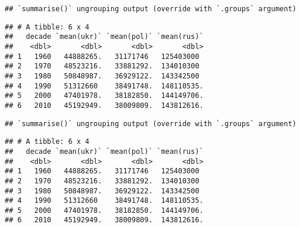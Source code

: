 \documentclass[
]{article}
\newenvironment{Shaded}{\begin{snugshade}}{\end{snugshade}}
\newcommand{\CommentTok}[1]{\textcolor[rgb]{0.56,0.35,0.01}{\textit{#1}}}
\newcommand{\DataTypeTok}[1]{\textcolor[rgb]{0.13,0.29,0.53}{#1}}
\newcommand{\DecValTok}[1]{\textcolor[rgb]{0.00,0.00,0.81}{#1}}
\newcommand{\KeywordTok}[1]{\textcolor[rgb]{0.13,0.29,0.53}{\textbf{#1}}}
\newcommand{\NormalTok}[1]{#1}
\newcommand{\OperatorTok}[1]{\textcolor[rgb]{0.81,0.36,0.00}{\textbf{#1}}}
\newcommand{\StringTok}[1]{\textcolor[rgb]{0.31,0.60,0.02}{#1}}
\begin{document}
\begin{verbatim}
## `summarise()` ungrouping output (override with `.groups` argument)
\end{verbatim}

\begin{verbatim}
## # A tibble: 6 x 4
##   decade `mean(ukr)` `mean(pol)` `mean(rus)`
##    <dbl>       <dbl>       <dbl>       <dbl>
## 1   1960   44888265.   31171746   125403000 
## 2   1970   48523216.   33881292.  134010300 
## 3   1980   50848987.   36929122.  143342500 
## 4   1990   51312660    38491748.  148110535.
## 5   2000   47401978.   38182850.  144149706.
## 6   2010   45192949.   38009809.  143812616.
\end{verbatim}

\begin{Shaded}
\end{Shaded}

\begin{verbatim}
## `summarise()` ungrouping output (override with `.groups` argument)
\end{verbatim}

\begin{verbatim}
## # A tibble: 6 x 4
##   decade `mean(ukr)` `mean(pol)` `mean(rus)`
##    <dbl>       <dbl>       <dbl>       <dbl>
## 1   1960   44888265.   31171746   125403000 
## 2   1970   48523216.   33881292.  134010300 
## 3   1980   50848987.   36929122.  143342500 
## 4   1990   51312660    38491748.  148110535.
## 5   2000   47401978.   38182850.  144149706.
## 6   2010   45192949.   38009809.  143812616.
\end{verbatim}
\end{document}

